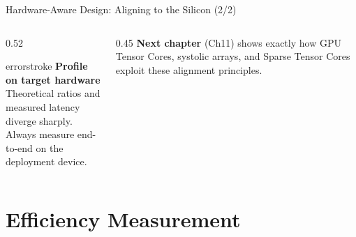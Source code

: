 \documentclass[aspectratio=169, 12pt]{beamer}
\begin{document}
\begin{frame}{Hardware-Aware Design: Aligning to the Silicon (2/2)}
\begin{columns}[T]
\begin{column}{0.52\textwidth}
    \vspace{0.15cm}
    \begin{mlsyscard}{errorstroke}
    {\scriptsize \textbf{Profile on target hardware}\\
    Theoretical ratios and measured latency diverge sharply.\\
    Always measure end-to-end on the deployment device.}
    \end{mlsyscard}
  \end{column}
  \begin{column}{0.45\textwidth}
    \vspace{0.3cm}
    {\scriptsize \textbf{Next chapter} (Ch11) shows exactly how GPU Tensor Cores, systolic arrays, and Sparse Tensor Cores exploit these alignment principles.}

    \vspace{0.3cm}
  \end{column}
\end{columns}

\end{frame}

\section{Efficiency Measurement}
\end{document}
